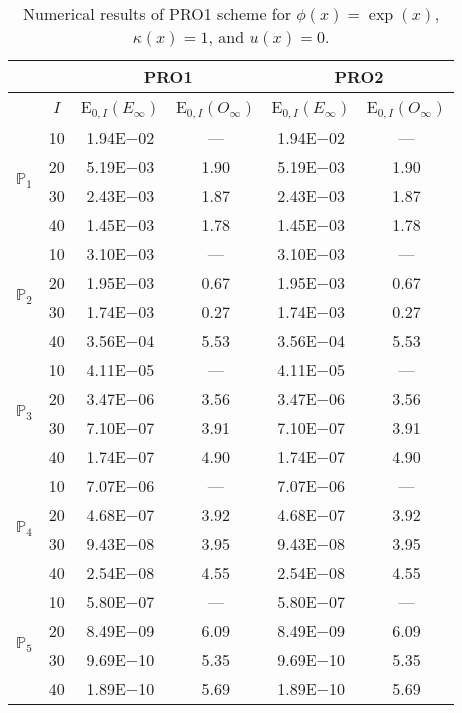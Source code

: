 \begin{table}[H]
\caption{Numerical results of PRO1 scheme for $\phi(x)=\exp(x)$, $\kappa(x)=1$, and $u(x)=0$.}
\setlength{\tabcolsep}{5pt}
\centering
\begin{tabular}{@{}l c c c c c@{}}
\toprule
 &  & \multicolumn{2}{c}{PRO1} & \multicolumn{2}{c}{PRO2}\\
\midrule
 & $I$ & E$_{0,I}(E_{\infty})$ & E$_{0,I}(O_{\infty})$ & E$_{0,I}(E_{\infty})$ & E$_{0,I}(O_{\infty})$\\
\midrule
\multirow{4}{*}{$\mathbb{P}_{1}$}
 & 10 & 1.94E$-$02 & --- & 1.94E$-$02 & ---\\
 & 20 & 5.19E$-$03 & 1.90 & 5.19E$-$03 & 1.90 \\
 & 30 & 2.43E$-$03 & 1.87 & 2.43E$-$03 & 1.87 \\
 & 40 & 1.45E$-$03 & 1.78 & 1.45E$-$03 & 1.78 \\
\midrule
\multirow{4}{*}{$\mathbb{P}_{2}$}
 & 10 & 3.10E$-$03 & --- & 3.10E$-$03 & ---\\
 & 20 & 1.95E$-$03 & 0.67 & 1.95E$-$03 & 0.67 \\
 & 30 & 1.74E$-$03 & 0.27 & 1.74E$-$03 & 0.27 \\
 & 40 & 3.56E$-$04 & 5.53 & 3.56E$-$04 & 5.53 \\
\midrule
\multirow{4}{*}{$\mathbb{P}_{3}$}
 & 10 & 4.11E$-$05 & --- & 4.11E$-$05 & ---\\
 & 20 & 3.47E$-$06 & 3.56 & 3.47E$-$06 & 3.56 \\
 & 30 & 7.10E$-$07 & 3.91 & 7.10E$-$07 & 3.91 \\
 & 40 & 1.74E$-$07 & 4.90 & 1.74E$-$07 & 4.90 \\
\midrule
\multirow{4}{*}{$\mathbb{P}_{4}$}
 & 10 & 7.07E$-$06 & --- & 7.07E$-$06 & ---\\
 & 20 & 4.68E$-$07 & 3.92 & 4.68E$-$07 & 3.92 \\
 & 30 & 9.43E$-$08 & 3.95 & 9.43E$-$08 & 3.95 \\
 & 40 & 2.54E$-$08 & 4.55 & 2.54E$-$08 & 4.55 \\
\midrule
\multirow{4}{*}{$\mathbb{P}_{5}$}
 & 10 & 5.80E$-$07 & --- & 5.80E$-$07 & ---\\
 & 20 & 8.49E$-$09 & 6.09 & 8.49E$-$09 & 6.09 \\
 & 30 & 9.69E$-$10 & 5.35 & 9.69E$-$10 & 5.35 \\
 & 40 & 1.89E$-$10 & 5.69 & 1.89E$-$10 & 5.69 \\
\bottomrule
\end{tabular}
\label{Table:PRO:Test1}
\end{table}
